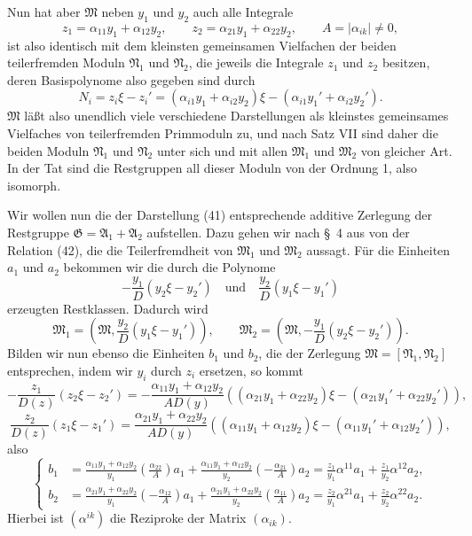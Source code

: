 \documentclass[11pt]{article}
\begin{document}
Nun hat aber $\mathfrak M$ neben $y_1$ und $y_2$ auch alle Integrale
\[
 z_1=\alpha_{11}y_1+\alpha_{12}y_2,
 \qquad
 z_2=\alpha_{21}y_1+\alpha_{22}y_2,
 \qquad
 A=|\alpha_{ik}|\ne0,
\]
ist also identisch mit dem kleinsten gemeinsamen Vielfachen der beiden teilerfremden Moduln $\mathfrak N_1$ und $\mathfrak N_2$, die jeweils die Integrale $z_1$ und $z_2$ besitzen, deren Basispolynome also gegeben sind durch
\[
 N_i=z_i\xi-z_i'=(\alpha_{i1}y_1+\alpha_{i2}y_2)\xi-(\alpha_{i1}y_1'+\alpha_{i2}y_2').
\]
$\mathfrak M$ läßt also unendlich viele verschiedene Darstellungen als kleinstes gemeinsames Vielfaches von teilerfremden Primmoduln zu, und nach Satz VII sind daher die beiden Moduln $\mathfrak N_1$ und $\mathfrak N_2$ unter sich und mit allen $\mathfrak M_1$ und $\mathfrak M_2$ von gleicher Art. In der Tat sind die Restgruppen all dieser Moduln von der Ordnung 1, also isomorph.

Wir wollen nun die der Darstellung (41) entsprechende additive Zerlegung der Restgruppe $\mathfrak G=\mathfrak A_1+\mathfrak A_2$ aufstellen. Dazu gehen wir nach \S~4 aus von der Relation (42), die die Teilerfremdheit von $\mathfrak M_1$ und $\mathfrak M_2$ aussagt. Für die Einheiten $a_1$ und $a_2$ bekommen wir die durch die Polynome
\[
 -\frac{y_1}{D}(y_2\xi-y_2')
 \quad\text{und}\quad
 \frac{y_2}{D}(y_1\xi-y_1')
\]
erzeugten Restklassen. Dadurch wird
\[
 \mathfrak M_1=\left(\mathfrak M,\frac{y_2}{D}(y_1\xi-y_1')\right),
 \qquad
 \mathfrak M_2=\left(\mathfrak M,-\frac{y_1}{D}(y_2\xi-y_2')\right).
\]
Bilden wir nun ebenso die Einheiten $b_1$ und $b_2$, die der Zerlegung $\mathfrak M=[\mathfrak N_1,
\mathfrak N_2]$ entsprechen, indem wir $y_i$ durch $z_i$ ersetzen, so kommt
\[
 -\frac{z_1}{D(z)}(z_2\xi-z_2')
 =-\frac{\alpha_{11}y_1+\alpha_{12}y_2}{AD(y)}
 ((\alpha_{21}y_1+\alpha_{22}y_2)\xi-(\alpha_{21}y_1'+\alpha_{22}y_2')),
\]
\[
 \frac{z_2}{D(z)}(z_1\xi-z_1')
 =\frac{\alpha_{21}y_1+\alpha_{22}y_2}{AD(y)}
 ((\alpha_{11}y_1+\alpha_{12}y_2)\xi-(\alpha_{11}y_1'+\alpha_{12}y_2')),
\]
also
\begin{equation}
\left\{
\begin{aligned}
 b_1&=\frac{\alpha_{11}y_1+\alpha_{12}y_2}{y_1}
 \left(\frac{\alpha_{22}}{A}\right)a_1
 +\frac{\alpha_{11}y_1+\alpha_{12}y_2}{y_2}
 \left(-\frac{\alpha_{21}}{A}\right)a_2
 =\frac{z_1}{y_1}\alpha^{11}a_1+\frac{z_1}{y_2}\alpha^{12}a_2,\\
 b_2&=\frac{\alpha_{21}y_1+\alpha_{22}y_2}{y_1}
 \left(-\frac{\alpha_{12}}{A}\right)a_1
 +\frac{\alpha_{21}y_1+\alpha_{22}y_2}{y_2}
 \left(\frac{\alpha_{11}}{A}\right)a_2
 =\frac{z_2}{y_1}\alpha^{21}a_1+\frac{z_2}{y_2}\alpha^{22}a_2.
\end{aligned}\right.
\tag{43}
\end{equation}
Hierbei ist $(\alpha^{ik})$ die Reziproke der Matrix $(\alpha_{ik})$.
\end{document}
